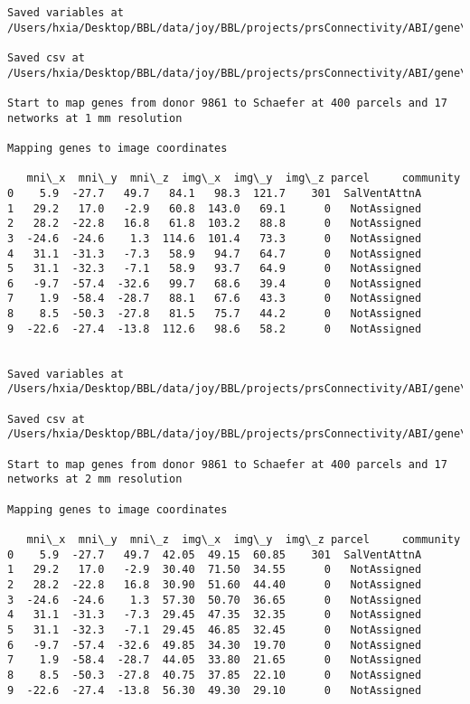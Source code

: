 \documentclass[11pt]{article}
\begin{document}
\begin{Verbatim}[commandchars=\\\{\}]
Saved variables at /Users/hxia/Desktop/BBL/data/joy/BBL/projects/prsConnectivity/ABI/gene\_mapping/9861donor\_400Parcels\_7Network\_2mm.pkl

Saved csv at /Users/hxia/Desktop/BBL/data/joy/BBL/projects/prsConnectivity/ABI/gene\_mapping/9861donor\_400Parcels\_7Network\_2mm.csv

Start to map genes from donor 9861 to Schaefer at 400 parcels and 17 networks at 1 mm resolution

Mapping genes to image coordinates

   mni\_x  mni\_y  mni\_z  img\_x  img\_y  img\_z parcel     community
0    5.9  -27.7   49.7   84.1   98.3  121.7    301  SalVentAttnA
1   29.2   17.0   -2.9   60.8  143.0   69.1      0   NotAssigned
2   28.2  -22.8   16.8   61.8  103.2   88.8      0   NotAssigned
3  -24.6  -24.6    1.3  114.6  101.4   73.3      0   NotAssigned
4   31.1  -31.3   -7.3   58.9   94.7   64.7      0   NotAssigned
5   31.1  -32.3   -7.1   58.9   93.7   64.9      0   NotAssigned
6   -9.7  -57.4  -32.6   99.7   68.6   39.4      0   NotAssigned
7    1.9  -58.4  -28.7   88.1   67.6   43.3      0   NotAssigned
8    8.5  -50.3  -27.8   81.5   75.7   44.2      0   NotAssigned
9  -22.6  -27.4  -13.8  112.6   98.6   58.2      0   NotAssigned


Saved variables at /Users/hxia/Desktop/BBL/data/joy/BBL/projects/prsConnectivity/ABI/gene\_mapping/9861donor\_400Parcels\_17Network\_1mm.pkl

Saved csv at /Users/hxia/Desktop/BBL/data/joy/BBL/projects/prsConnectivity/ABI/gene\_mapping/9861donor\_400Parcels\_17Network\_1mm.csv

Start to map genes from donor 9861 to Schaefer at 400 parcels and 17 networks at 2 mm resolution

Mapping genes to image coordinates

   mni\_x  mni\_y  mni\_z  img\_x  img\_y  img\_z parcel     community
0    5.9  -27.7   49.7  42.05  49.15  60.85    301  SalVentAttnA
1   29.2   17.0   -2.9  30.40  71.50  34.55      0   NotAssigned
2   28.2  -22.8   16.8  30.90  51.60  44.40      0   NotAssigned
3  -24.6  -24.6    1.3  57.30  50.70  36.65      0   NotAssigned
4   31.1  -31.3   -7.3  29.45  47.35  32.35      0   NotAssigned
5   31.1  -32.3   -7.1  29.45  46.85  32.45      0   NotAssigned
6   -9.7  -57.4  -32.6  49.85  34.30  19.70      0   NotAssigned
7    1.9  -58.4  -28.7  44.05  33.80  21.65      0   NotAssigned
8    8.5  -50.3  -27.8  40.75  37.85  22.10      0   NotAssigned
9  -22.6  -27.4  -13.8  56.30  49.30  29.10      0   NotAssigned



\end{Verbatim}
\end{document}
